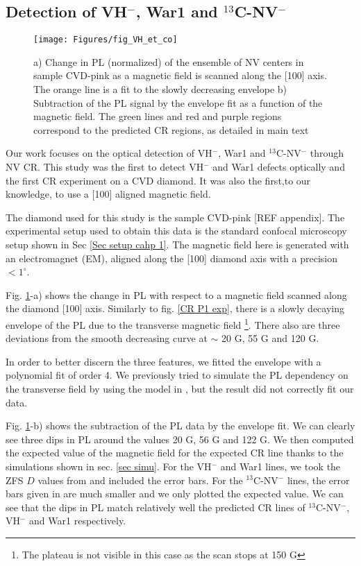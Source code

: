 \documentclass[a4paper,11pt]{report}
\begin{document}
\subsection{Detection of VH$^-$, War1 and $^{13}$C-NV$^-$}

\begin{figure}[h]
\centering
\texttt{[image: Figures/fig\_VH\_et\_co]}
\caption{a) Change in PL (normalized) of the ensemble of NV centers in sample CVD-pink as a magnetic field is scanned along the [100] axis. The orange line is a fit to the slowly decreasing envelope b) Subtraction of the PL signal by the envelope fit as a function of the magnetic field. The green lines and red and purple regions correspond to the predicted CR regions, as detailed in main text}
\label{CR VH exp}
\end{figure}

Our work \citep{pellet2021optical} focuses on the optical detection of VH$^-$, War1 and $^{13}$C-NV$^-$ through NV CR. This study was the first to detect VH$^-$ and War1 defects optically and the first CR experiment on a CVD diamond. It was also the first,to our knowledge, to use a [100] aligned magnetic field.

The diamond used for this study is the sample CVD-pink [REF appendix]. The experimental setup used to obtain this data is the standard confocal microscopy setup shown in Sec \ref{Sec setup cahp 1}. The magnetic field here is generated with an electromagnet (EM), aligned along the [100] diamond axis with a precision $<1^\circ$. 

Fig. \ref{CR VH exp}-a) shows the change in PL with respect to a magnetic field scanned along the diamond [100] axis. Similarly to fig. \ref{CR P1 exp}, there is a slowly decaying envelope of the PL due to the transverse magnetic field \footnote{The plateau is not visible in this case as the scan stops at 150 G}. There also are three deviations from the smooth decreasing curve at $\sim$ 20 G, 55 G and 120 G.

In order to better discern the three features, we fitted the envelope with a polynomial fit of order 4. We previously tried to simulate the PL dependency on the transverse field  by using the model in \citep{tetienne2012magnetic}, but the result did not correctly fit our data.

Fig. \ref{CR VH exp}-b) shows the subtraction of the PL data by the envelope fit. We can clearly see three dips in PL around the values 20 G, 56 G and 122 G. We then computed the expected value of the magnetic field for the expected CR line thanks to the simulations shown in sec. \ref{sec simu}. For the VH$^-$ and War1 lines, we took the ZFS $D$ values from \citep{cruddace2007magnetic} and included the error bars. For the $^{13}$C-NV$^-$ lines, the error bars given in \citep{simanovskaia2013sidebands} are much smaller and we only plotted the expected value. We can see that the dips in PL match relatively well the predicted CR lines of $^{13}$C-NV$^-$, VH$^-$ and War1 respectively.
\end{document}
